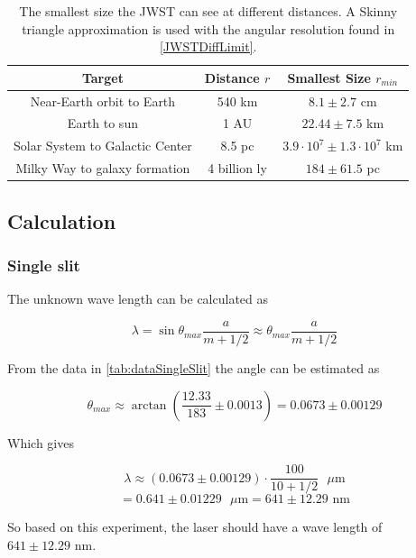 \documentclass{emulateapj}
\begin{document}
\begin{table}[H]
\centering
\begin{tabular}{ c c c }
Target & Distance $r$ & Smallest Size $r_{min}$ \\
\hline
Near-Earth orbit to Earth & 540 km &$8.1 \pm 2.7$ cm \\
Earth to sun & 1 AU & $22.44 \pm 7.5$ km \\
Solar System to Galactic Center & 8.5 pc & $3.9\cdot 10^7 \pm 1.3\cdot 10^7$ km \\
Milky Way to galaxy formation &  4 billion ly & $184 \pm 61.5$ pc 
\end{tabular}
\caption{The smallest size the JWST can see at different distances. A Skinny triangle approximation is used with the angular resolution found in \eqref{JWSTDiffLimit}.}
\end{table}\label{tab:visionJWST}


\subsection{Calculation}
\subsubsection{Single slit}
The unknown wave length can be calculated as

\begin{equation}
\lambda = \sin \theta_{max}\frac{a}{m+1/2} \approx \theta_{max}\frac{a}{m+1/2}
\end{equation}

From the data in \ref{tab:dataSingleSlit} the angle can be estimated as

\begin{equation}
\theta_{max} \approx \arctan\left( \frac{12.33}{183} \pm 0.0013 \right) = 0.0673 \pm 0.00129
\end{equation}

Which gives 

\begin{equation}
\lambda \approx (0.0673 \pm 0.00129) \cdot \frac{100}{10 +1/2}\text{ }\mu \text{m} 
\end{equation}
\begin{equation}
= 0.641\pm 0.01229\text{ }\mu \text{m} = 641 \pm 12.29 \text{ nm}
\end{equation}\label{eq:waveLenghtLaser}

So based on this experiment, the laser should have a wave length of $641 \pm 12.29 \text{ nm}$.
\end{document}

